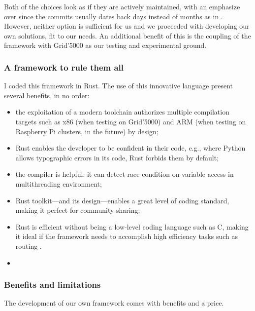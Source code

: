 \documentclass[11pt]{sdm}
\begin{document}
Both of the choices look as if they are actively maintained, with an emphasize over \cite{smartfog_fogflow_2022} since the commits usually dates back days instead of months as in \cite{deng_fogbus2_2021}.
However, neither option is  sufficient for us and we proceeded with developing our own solutions, fit to our needs. An additional benefit of this is the coupling of the framework with Grid'5000 as our testing and experimental ground.

\subsubsection{A framework to rule them all}

I coded this framework in Rust. The use of this innovative language present several benefits, in no order:
\begin{itemize}
	\item the exploitation of a modern toolchain authorizes multiple compilation targets such as x86 (when testing on Grid'5000) and ARM (when testing on Raspberry Pi clusters, in the future) by design;
	\item Rust enables the developer to be confident in their code, e.g., where Python allows typographic errors in its code, Rust forbids them by default;
	\item the compiler is helpful: it can detect race condition on variable access in multithreading environment;
	\item Rust toolkit—and its design—enables a great level of coding standard, making it perfect for community sharing;
	\item Rust is efficient without being a low-level coding language such as C, making it ideal if the framework needs to accomplish high efficiency tasks such as routing .
	\item 
\end{itemize}


\subsubsection{Benefits and limitations}

The development of our own framework comes with benefits and a price.
\end{document}
